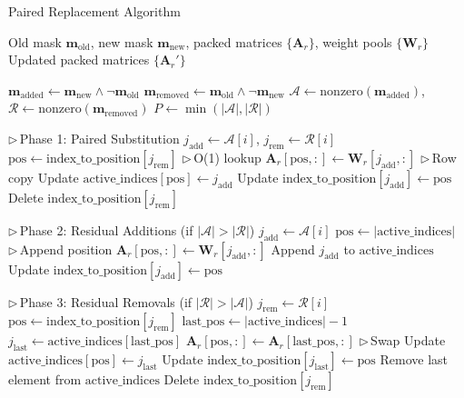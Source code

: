 \documentclass{article}
\newcommand{\LineComment}[1]{\(\triangleright\)\,#1}
\numberwithin{equation}{section}
\theoremstyle{plain}
\theoremstyle{definition}
\theoremstyle{remark}
\begin{document}
\begin{algorithm}[t]
\caption{Paired Replacement Algorithm}
\label{alg:paired_replacement}
\begin{algorithmic}[1]
\Require Old mask $\mathbf{m}_{\text{old}}$, new mask $\mathbf{m}_{\text{new}}$, packed matrices $\{\mathbf{A}_r\}$, weight pools $\{\mathbf{W}_r\}$
\Ensure Updated packed matrices $\{\mathbf{A}_r'\}$

\State $\mathbf{m}_{\text{added}} \leftarrow \mathbf{m}_{\text{new}} \land \neg \mathbf{m}_{\text{old}}$
\State $\mathbf{m}_{\text{removed}} \leftarrow \mathbf{m}_{\text{old}} \land \neg \mathbf{m}_{\text{new}}$
\State $\mathcal{A} \leftarrow \text{nonzero}(\mathbf{m}_{\text{added}})$, $\mathcal{R} \leftarrow \text{nonzero}(\mathbf{m}_{\text{removed}})$
\State $P \leftarrow \min(|\mathcal{A}|, |\mathcal{R}|)$

\LineComment{Phase 1: Paired Substitution}
    \State $j_{\text{add}} \leftarrow \mathcal{A}[i]$, $j_{\text{rem}} \leftarrow \mathcal{R}[i]$
    \State $\text{pos} \leftarrow \text{index\_to\_position}[j_{\text{rem}}]$ \LineComment{O(1) lookup}
        \State $\mathbf{A}_r[\text{pos}, :] \leftarrow \mathbf{W}_r[j_{\text{add}}, :]$ \LineComment{Row copy}
    \EndFor
    \State Update $\text{active\_indices}[\text{pos}] \leftarrow j_{\text{add}}$
    \State Update $\text{index\_to\_position}[j_{\text{add}}] \leftarrow \text{pos}$
    \State Delete $\text{index\_to\_position}[j_{\text{rem}}]$
\EndFor

\LineComment{Phase 2: Residual Additions (if $|\mathcal{A}| > |\mathcal{R}|$)}
    \State $j_{\text{add}} \leftarrow \mathcal{A}[i]$
    \State $\text{pos} \leftarrow |\text{active\_indices}|$ \LineComment{Append position}
        \State $\mathbf{A}_r[\text{pos}, :] \leftarrow \mathbf{W}_r[j_{\text{add}}, :]$
    \EndFor
    \State Append $j_{\text{add}}$ to $\text{active\_indices}$
    \State Update $\text{index\_to\_position}[j_{\text{add}}] \leftarrow \text{pos}$
\EndFor

\LineComment{Phase 3: Residual Removals (if $|\mathcal{R}| > |\mathcal{A}|$)}
    \State $j_{\text{rem}} \leftarrow \mathcal{R}[i]$
    \State $\text{pos} \leftarrow \text{index\_to\_position}[j_{\text{rem}}]$
    \State $\text{last\_pos} \leftarrow |\text{active\_indices}| - 1$
        \State $j_{\text{last}} \leftarrow \text{active\_indices}[\text{last\_pos}]$
            \State $\mathbf{A}_r[\text{pos}, :] \leftarrow \mathbf{A}_r[\text{last\_pos}, :]$ \LineComment{Swap}
        \EndFor
        \State Update $\text{active\_indices}[\text{pos}] \leftarrow j_{\text{last}}$
        \State Update $\text{index\_to\_position}[j_{\text{last}}] \leftarrow \text{pos}$
    \EndIf
    \State Remove last element from $\text{active\_indices}$
    \State Delete $\text{index\_to\_position}[j_{\text{rem}}]$
\EndFor
\end{algorithmic}
\end{algorithm}
\end{document}
